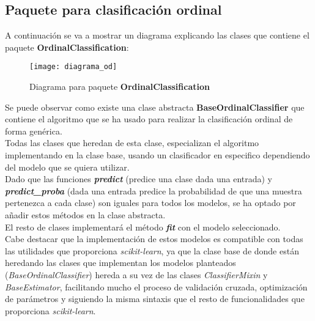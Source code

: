 \subsection{Paquete para clasificación ordinal}
\label{sec:sftw-ocl}
A continuación se va a mostrar un diagrama explicando las clases que contiene el paquete \textbf{OrdinalClassification}:
\begin{figure}[H]
    \centering
    \texttt{[image: diagrama\_od]}
    \caption{Diagrama para paquete \textbf{OrdinalClassification}}
    \label{dig:paquetes_od}
\end{figure}
Se puede observar como existe una clase abstracta \textbf{BaseOrdinalClassifier} que contiene el algoritmo que se ha usado para realizar la clasificación ordinal de forma genérica. \\
Todas las clases que heredan de esta clase, especializan el algoritmo implementando en la clase base, usando un clasificador en especifico dependiendo del modelo que se quiera utilizar.\\
Dado que las funciones \textbf{\textit{predict}} (predice una clase dada una entrada) y \textbf{\textit{predict\_proba}} (dada una entrada predice la probabilidad de que una muestra pertenezca a cada clase) son iguales para todos los modelos, se ha optado por añadir estos métodos en la clase abstracta.\\
El resto de clases implementará el método \textbf{\textit{fit}} con el modelo seleccionado. \\
\linebreak
Cabe destacar que la implementación de estos modelos es compatible con todas las utilidades que proporciona \textit{scikit-learn}, ya que la clase base de donde están heredando las clases que implementan los modelos planteados (\textit{BaseOrdinalClassifier}) hereda a su vez de las clases \textit{ClassifierMixin} y \textit{BaseEstimator}, facilitando mucho el proceso de validación cruzada, optimización de parámetros y siguiendo la misma sintaxis que el resto de funcionalidades que proporciona \textit{scikit-learn}.
